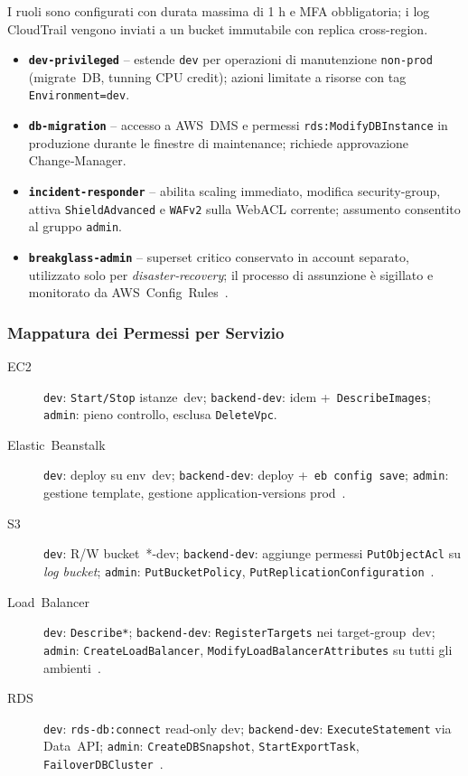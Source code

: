 \documentclass[a4paper,12pt]{report}
\begin{document}
I ruoli sono configurati con durata massima di 1 h e MFA obbligatoria;
i log CloudTrail vengono inviati a un bucket immutabile con
replica cross-region.

\begin{itemize}
  \item \textbf{\texttt{dev‑privileged}} – estende \texttt{dev} per operazioni
        di manutenzione \texttt{non‑prod} (migrate DB, tunning CPU credit);
        azioni limitate a risorse con tag \texttt{Environment=dev}.  
  \item \textbf{\texttt{db‑migration}} – accesso a AWS DMS e permessi
        \texttt{rds:ModifyDBInstance} in produzione durante le finestre di
        maintenance; richiede approvazione Change‑Manager.  
  \item \textbf{\texttt{incident‑responder}} – abilita scaling immediato,
        modifica security‑group, attiva \texttt{ShieldAdvanced} e
        \texttt{WAFv2} sulla WebACL corrente; assumento consentito al gruppo
        \texttt{admin}.  
  \item \textbf{\texttt{breakglass‑admin}} – superset critico conservato in
        account separato, utilizzato solo per \emph{disaster‑recovery}; il
        processo di assunzione è sigillato e monitorato da AWS Config Rules \cite{AWSSTS}.  
\end{itemize}

\subsubsection{Mappatura dei Permessi per Servizio}
\label{subsubsec:mappa_servizi}

\begin{description}
  \item[EC2] \texttt{dev}: \texttt{Start/Stop} istanze dev; \texttt{backend‑dev}: idem + \texttt{DescribeImages}; \texttt{admin}: pieno controllo, esclusa
        \texttt{DeleteVpc}.  
  \item[Elastic Beanstalk] \texttt{dev}: deploy su env dev; \texttt{backend‑dev}: deploy + \texttt{eb config save}; \texttt{admin}: gestione template, gestione
        application‑versions prod \cite{AWSEBRole}.  
  \item[S3] \texttt{dev}: R/W bucket *-dev; \texttt{backend‑dev}: aggiunge permessi
        \texttt{PutObjectAcl} su \emph{log bucket}; \texttt{admin}:
        \texttt{PutBucketPolicy}, \texttt{PutReplicationConfiguration} \cite{AWSS3Security}.  
  \item[Load Balancer] \texttt{dev}: \texttt{Describe*}; \texttt{backend‑dev}: \texttt{RegisterTargets} nei target‑group dev; \texttt{admin}: \texttt{CreateLoadBalancer}, \texttt{ModifyLoadBalancerAttributes} su tutti gli ambienti \cite{AWSELBIAM}.  
  \item[RDS] \texttt{dev}: \texttt{rds-db:connect} read‑only dev; \texttt{backend‑dev}:
        \texttt{ExecuteStatement} via Data API; \texttt{admin}:
        \texttt{CreateDBSnapshot}, \texttt{StartExportTask}, \texttt{FailoverDBCluster} \cite{AWSRDSIAM}.  
\end{description}
\end{document}
